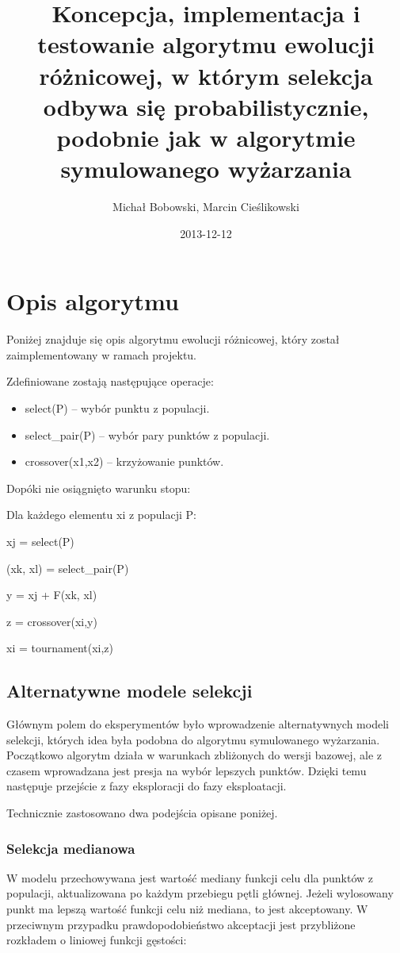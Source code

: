 \documentclass[11pt]{article}
\author{Michał Bobowski, Marcin Cieślikowski}
\date{2013-12-12}
\title{Koncepcja, implementacja i testowanie algorytmu ewolucji różnicowej, w którym selekcja odbywa się probabilistycznie, podobnie jak w algorytmie symulowanego wyżarzania}
\begin{document}
  \maketitle

\section{Opis algorytmu}
Poniżej znajduje się opis algorytmu ewolucji różnicowej, który został zaimplementowany w ramach projektu.

\noindent Zdefiniowane zostają następujące operacje:

\begin{itemize}
 \item select(P) – wybór punktu z populacji.
 \item select\_pair(P) – wybór pary punktów z populacji.
 \item crossover(x1,x2) – krzyżowanie punktów.
\end{itemize}

\noindent Dopóki nie osiągnięto warunku stopu:

\hspace{10pt}Dla każdego elementu xi z populacji P:

\hspace{20pt}xj = select(P)

\hspace{20pt}(xk, xl) = select\_pair(P)

\hspace{20pt}y = xj + F(xk, xl)

\hspace{20pt}z = crossover(xi,y)

\hspace{20pt}xi = tournament(xi,z)

\subsection{Alternatywne modele selekcji}
Głównym polem do eksperymentów było wprowadzenie alternatywnych modeli selekcji, których idea była podobna do algorytmu symulowanego wyżarzania.
Początkowo algorytm działa w warunkach zbliżonych do wersji bazowej, ale z czasem wprowadzana jest presja na wybór lepszych punktów.
Dzięki temu następuje przejście z fazy eksploracji do fazy eksploatacji.

\noindent Technicznie zastosowano dwa podejścia opisane poniżej.

\subsubsection{Selekcja medianowa}
W modelu przechowywana jest wartość mediany funkcji celu dla punktów z populacji, aktualizowana po każdym przebiegu pętli głównej.
Jeżeli wylosowany punkt ma lepszą wartość funkcji celu niż mediana, to jest akceptowany.
W przeciwnym przypadku prawdopodobieństwo akceptacji jest przybliżone rozkładem o liniowej funkcji gęstości:
\end{document}

